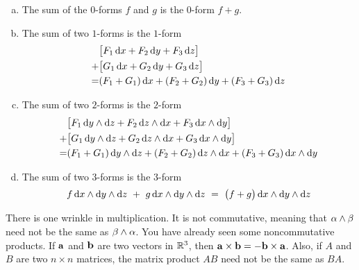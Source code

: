 \begin{defn}\label{def:differentialFormAdd}
\begin{enumerate}[(a)]
\item 
The sum of the $0$-forms  $f$ and $g$ is the $0$-form $f+g$.

\item
The sum of two $1$-forms is the $1$-form
\begin{align*} 
  &\big[F_1\,\mathrm{d}x
          + F_2\,\mathrm{d}y
          + F_3\,\mathrm{d}z\big] \\
  +&\big[G_1\,\mathrm{d}x
          + G_2\,\mathrm{d}y
          + G_3\,\mathrm{d}z\big] \\
 =& (F_1+G_1)\,\mathrm{d}x
          + (F_2+G_2)\,\mathrm{d}y
          + (F_3+G_3)\,\mathrm{d}z 
\end{align*}

\item
The sum of two $2$-forms is the $2$-form
\begin{align*} 
  &\big[F_1\,\mathrm{d}y\wedge\mathrm{d}z
          + F_2\,\mathrm{d}z\wedge\mathrm{d}x
          + F_3\,\mathrm{d}x\wedge\mathrm{d}y\big] \\
  +&\big[G_1\,\mathrm{d}y\wedge\mathrm{d}z
          + G_2\,\mathrm{d}z\wedge\mathrm{d}x
          + G_3\,\mathrm{d}x\wedge\mathrm{d}y\big] \\
  =&(F_1+G_1)\,\mathrm{d}y\wedge\mathrm{d}z
          + (F_2+G_2)\,\mathrm{d}z\wedge\mathrm{d}x
          + (F_3+G_3)\,\mathrm{d}x\wedge\mathrm{d}y 
\end{align*}

\item
The sum of two $3$-forms is the $3$-form
\begin{align*} 
   f\,\mathrm{d}x\wedge\mathrm{d}y\wedge\mathrm{d}z 
 \ +\  g\,\mathrm{d}x\wedge\mathrm{d}y\wedge\mathrm{d}z 
 \ =\  \big(f+g\big)\,\mathrm{d}x\wedge\mathrm{d}y\wedge\mathrm{d}z
\end{align*}
\end{enumerate}
\end{defn}


There is one wrinkle in multiplication. It is not commutative,
meaning that $\alpha\wedge\beta$ need not be the same as $\beta\wedge\alpha$.
You have already seen some noncommutative products. If $\mathbf{a}$ and $\mathbf{b}$
are two vectors in $\mathbb{R}^3$, then $\mathbf{a}\times\mathbf{b} = -\mathbf{b}\times \mathbf{a}$.
Also, if $A$ and $B$ are two $n\times n$ matrices, the matrix product 
$AB$ need not be the same  as $BA$. 

